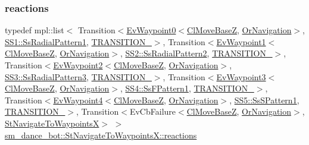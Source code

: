 \subsubsection{\texorpdfstring{reactions}{reactions}}
{\footnotesize\ttfamily typedef mpl\+::list$<$ Transition$<$\hyperlink{structcl__move__base__z_1_1EvWaypoint0}{Ev\+Waypoint0}$<$\hyperlink{classcl__move__base__z_1_1ClMoveBaseZ}{Cl\+Move\+BaseZ}, \hyperlink{classsm__dance__bot_1_1OrNavigation}{Or\+Navigation}$>$, \hyperlink{structsm__dance__bot_1_1SS1_1_1SsRadialPattern1}{S\+S1\+::\+Ss\+Radial\+Pattern1}, \hyperlink{structsm__dance__bot_1_1StNavigateToWaypointsX_1_1TRANSITION__1}{T\+R\+A\+N\+S\+I\+T\+I\+O\+N\+\_}$>$, Transition$<$\hyperlink{structcl__move__base__z_1_1EvWaypoint1}{Ev\+Waypoint1}$<$\hyperlink{classcl__move__base__z_1_1ClMoveBaseZ}{Cl\+Move\+BaseZ}, \hyperlink{classsm__dance__bot_1_1OrNavigation}{Or\+Navigation}$>$, \hyperlink{structsm__dance__bot_1_1SS2_1_1SsRadialPattern2}{S\+S2\+::\+Ss\+Radial\+Pattern2}, \hyperlink{structsm__dance__bot_1_1StNavigateToWaypointsX_1_1TRANSITION__2}{T\+R\+A\+N\+S\+I\+T\+I\+O\+N\+\_}$>$, Transition$<$\hyperlink{structcl__move__base__z_1_1EvWaypoint2}{Ev\+Waypoint2}$<$\hyperlink{classcl__move__base__z_1_1ClMoveBaseZ}{Cl\+Move\+BaseZ}, \hyperlink{classsm__dance__bot_1_1OrNavigation}{Or\+Navigation}$>$, \hyperlink{structsm__dance__bot_1_1SS3_1_1SsRadialPattern3}{S\+S3\+::\+Ss\+Radial\+Pattern3}, \hyperlink{structsm__dance__bot_1_1StNavigateToWaypointsX_1_1TRANSITION__3}{T\+R\+A\+N\+S\+I\+T\+I\+O\+N\+\_}$>$, Transition$<$\hyperlink{structcl__move__base__z_1_1EvWaypoint3}{Ev\+Waypoint3}$<$\hyperlink{classcl__move__base__z_1_1ClMoveBaseZ}{Cl\+Move\+BaseZ}, \hyperlink{classsm__dance__bot_1_1OrNavigation}{Or\+Navigation}$>$, \hyperlink{structsm__dance__bot_1_1SS4_1_1SsFPattern1}{S\+S4\+::\+Ss\+F\+Pattern1}, \hyperlink{structsm__dance__bot_1_1StNavigateToWaypointsX_1_1TRANSITION__4}{T\+R\+A\+N\+S\+I\+T\+I\+O\+N\+\_}$>$, Transition$<$\hyperlink{structcl__move__base__z_1_1EvWaypoint4}{Ev\+Waypoint4}$<$\hyperlink{classcl__move__base__z_1_1ClMoveBaseZ}{Cl\+Move\+BaseZ}, \hyperlink{classsm__dance__bot_1_1OrNavigation}{Or\+Navigation}$>$, \hyperlink{structsm__dance__bot_1_1SS5_1_1SsSPattern1}{S\+S5\+::\+Ss\+S\+Pattern1}, \hyperlink{structsm__dance__bot_1_1StNavigateToWaypointsX_1_1TRANSITION__5}{T\+R\+A\+N\+S\+I\+T\+I\+O\+N\+\_}$>$, Transition$<$Ev\+Cb\+Failure$<$\hyperlink{classcl__move__base__z_1_1ClMoveBaseZ}{Cl\+Move\+BaseZ}, \hyperlink{classsm__dance__bot_1_1OrNavigation}{Or\+Navigation}$>$, \hyperlink{structsm__dance__bot_1_1StNavigateToWaypointsX}{St\+Navigate\+To\+WaypointsX}$>$ $>$ \hyperlink{structsm__dance__bot_1_1StNavigateToWaypointsX_a0ed182d309e81ef909b0733b3e63a1c2}{sm\+\_\+dance\+\_\+bot\+::\+St\+Navigate\+To\+Waypoints\+X\+::reactions}}



